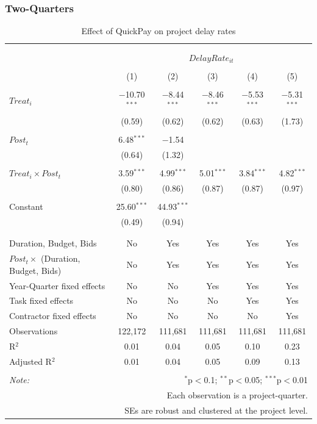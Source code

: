 \documentclass[
]{article}
\begin{document}
\hypertarget{two-quarters-1}{%
\subsubsection{Two-Quarters}\label{two-quarters-1}}

\begin{table}[H] \centering 
  \caption{Effect of QuickPay on project delay rates} 
  \label{} 
\small 
\begin{tabular}{@{\extracolsep{-2pt}}lccccc} 
\\[-1.8ex]\hline 
\hline \\[-1.8ex] 
\\[-1.8ex] & \multicolumn{5}{c}{$DelayRate_{it}$} \\ 
\\[-1.8ex] & (1) & (2) & (3) & (4) & (5)\\ 
\hline \\[-1.8ex] 
 $Treat_i$ & $-$10.70$^{***}$ & $-$8.44$^{***}$ & $-$8.46$^{***}$ & $-$5.53$^{***}$ & $-$5.31$^{***}$ \\ 
  & (0.59) & (0.62) & (0.62) & (0.63) & (1.73) \\ 
  & & & & & \\ 
 $Post_t$ & 6.48$^{***}$ & $-$1.54 &  &  &  \\ 
  & (0.64) & (1.32) &  &  &  \\ 
  & & & & & \\ 
 $Treat_i \times Post_t$ & 3.59$^{***}$ & 4.99$^{***}$ & 5.01$^{***}$ & 3.84$^{***}$ & 4.82$^{***}$ \\ 
  & (0.80) & (0.86) & (0.87) & (0.87) & (0.97) \\ 
  & & & & & \\ 
 Constant & 25.60$^{***}$ & 44.93$^{***}$ &  &  &  \\ 
  & (0.49) & (0.94) &  &  &  \\ 
  & & & & & \\ 
\hline \\[-1.8ex] 
Duration, Budget, Bids & No & Yes & Yes & Yes & Yes \\ 
$Post_t \times$  (Duration, Budget, Bids) & No & Yes & Yes & Yes & Yes \\ 
Year-Quarter fixed effects & No & No & Yes & Yes & Yes \\ 
Task fixed effects & No & No & No & Yes & Yes \\ 
Contractor fixed effects & No & No & No & No & Yes \\ 
Observations & 122,172 & 111,681 & 111,681 & 111,681 & 111,681 \\ 
R$^{2}$ & 0.01 & 0.04 & 0.05 & 0.10 & 0.23 \\ 
Adjusted R$^{2}$ & 0.01 & 0.04 & 0.05 & 0.09 & 0.13 \\ 
\hline 
\hline \\[-1.8ex] 
\textit{Note:}  & \multicolumn{5}{r}{$^{*}$p$<$0.1; $^{**}$p$<$0.05; $^{***}$p$<$0.01} \\ 
 & \multicolumn{5}{r}{Each observation is a project-quarter.} \\ 
 & \multicolumn{5}{r}{SEs are robust and clustered at the project level.} \\ 
\end{tabular} 
\end{table}
\end{document}
